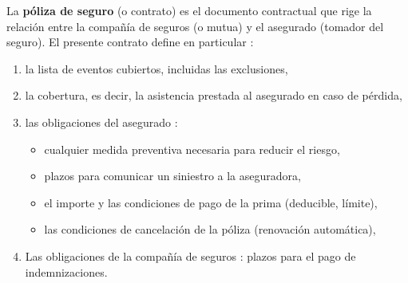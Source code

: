 \begin{f}
	
	La \textbf{póliza de seguro} (o contrato) es el documento contractual que rige la relación entre la compañía de seguros (o mutua) y el asegurado (tomador del seguro). 
	El presente contrato define en particular :
	
	\begin{enumerate}
		\item la lista de eventos cubiertos, incluidas las exclusiones,
		\item la cobertura, es decir, la asistencia prestada al asegurado en caso de pérdida,
		\item las obligaciones del asegurado :
		\begin{itemize}
			\item cualquier medida preventiva necesaria para reducir el riesgo,
			\item plazos para comunicar un siniestro a la aseguradora,
			\item el importe y las condiciones de pago de la prima (deducible, límite),
			\item las condiciones de cancelación de la póliza (renovación automática),
		\end{itemize}
		\item  Las obligaciones de la compañía de seguros : plazos para el pago de indemnizaciones.
		
	\end{enumerate}
	
\end{f}

